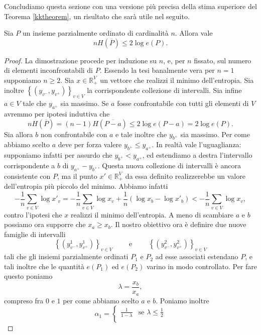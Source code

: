 Concludiamo questa sezione con una versione più precisa della stima superiore del Teorema \ref{kktheorem}, un risultato che sarà utile nel seguito. 
\begin{theorem}
   \label{cfjjmtheorem} Sia \(P\) un insieme parzialmente ordinato di cardinalità \(n\). Allora vale
  \[nH\left(\overline{P}\right)\le 2\log{e(P)}.\]
\end{theorem}
\begin{proof}
  La dimostrazione procede per induzione su \(n\), e, per \(n\) fissato, sul numero di elementi inconfrontabili di \(P\). Essendo la tesi banalmente vera per \(n=1\) supponiamo \(n\ge 2\). Sia \(x\in \mathbb{R}_{+}^{V}\) un vettore che realizzi il minimo dell'entropia. Sia inoltre \(\left\{\left(y_{v^-},y_{v^+}\right)\right\}_{v\in V}\) la corrispondente collezione di intervalli. Sia infine \(a\in V\) tale che \(y_{a^+}\) sia massimo. Se \(a\) fosse confrontabile con tutti gli elementi di \(V\) avremmo per ipotesi induttiva che
  \[nH\left(\overline{P}\right)=(n-1)H\left(\overline{P-a}\right)\le 2\log{e(P-a)=2\log{e(P)}}.\]
  Sia allora \(b\) non confrontabile con \(a\) e tale inoltre che \(y_{b^+}\) sia massimo. Per come abbiamo scelto \(a\) deve per forza valere \(y_{b^+}\le y_{a^+}\). In realtà vale l'uguaglianza: supponiamo infatti per assurdo che \(y_{b^+}<y_{a^+}\), ed estendiamo a destra l'intervallo corrispondente a \(b\) di \(y_{a^+}-y_{b^+}\). Questa nuova collezione di intervalli è ancora consistente con \(P\), ma il punto \(x'\in \mathbb{R}_{+}^{V}\) da essa definito realizzerebbe un valore dell'entropia più piccolo del minimo. Abbiamo infatti
  \[-\frac{1}{n}\sum_{v\in V}{\log{x'_{v}}}=-\frac{1}{n}\sum_{v\in V}{\log{x_{v}}}+\frac{1}{n}\left(\log{x_b}-\log{x'_{b}}\right)<-\frac{1}{n}\sum_{v\in V}{\log{x_v}},\]
  contro l'ipotesi che \(x\) realizzi il minimo dell'entropia. A meno di scambiare \(a\) e \(b\) possiamo ora supporre che \(x_a\ge x_b\). Il nostro obiettivo ora è definire due nuove famiglie di intervalli
  \[\left\{\left(y_{v^-}^1, y_{v^+}^1\right)\right\}_{v\in V}\qquad\mbox{ e }\qquad\left\{\left(y_{v^-}^2, y_{v^+}^2\right)\right\}_{v\in V}\]
  tali che gli insiemi parzialmente ordinati \(P_1\) e \(P_2\) ad esse associati estendano \(P\), e tali inoltre che le quantità \(e(P_1)\) ed \(e(P_2)\) varino in modo controllato. Per fare questo poniamo
  \[\lambda=\frac{x_b}{x_a},\]
  compreso fra \(0\) e \(1\) per come abbiamo scelto \(a\) e \(b\). Poniamo inoltre
  \[\alpha_1= 
  \begin{cases}
    \frac{1}{1-\lambda} & \mbox{se } \lambda\le\frac{1}{2} \\

\end{cases}\]
\end{proof}
